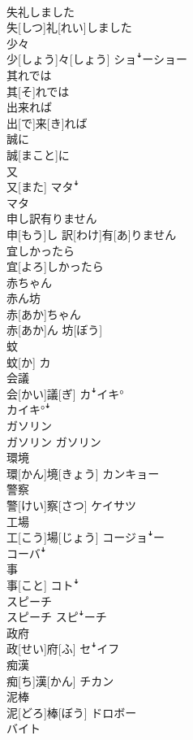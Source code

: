 \documentclass[8pt]{extreport}
\begin{document}
\begin{CJK}{UTF8}{min}
\\	失礼しました	
\\	失[しつ]礼[れい]しました	
\\	少々	
\\	少[しょう]々[しょう]	ショꜜーショー
\\	其れでは	
\\	其[そ]れでは	
\\	出来れば	
\\	出[で]来[き]れば	
\\	誠に	
\\	誠[まこと]に	
\\	又	
\\	又[また]	マタꜜ 
\\	マタ
\\	申し訳有りません	
\\	申[もう]し 訳[わけ]有[あ]りません	
\\	宜しかったら	
\\	宜[よろ]しかったら	
\\	赤ちゃん 
\\	赤ん坊	
\\	赤[あか]ちゃん 
\\	赤[あか]ん 坊[ぼう]	
\\	蚊	
\\	蚊[か]	カ
\\	会議	
\\	会[かい]議[ぎ]	カꜜイキ° 
\\	カイキ°ꜜ
\\	ガソリン	
\\	ガソリン	ガソリン
\\	環境	
\\	環[かん]境[きょう]	カンキョー
\\	警察	
\\	警[けい]察[さつ]	ケイサツ
\\	工場	
\\	工[こう]場[じょう]	コージョꜜー 
\\	コーバꜜ
\\	事	
\\	事[こと]	コトꜜ
\\	スピーチ	
\\	スピーチ	スピꜜーチ
\\	政府	
\\	政[せい]府[ふ]	セꜜイフ
\\	痴漢	
\\	痴[ち]漢[かん]	チカン
\\	泥棒	
\\	泥[どろ]棒[ぼう]	ドロボー
\\	バイト	

\end{CJK}
\end{document}
